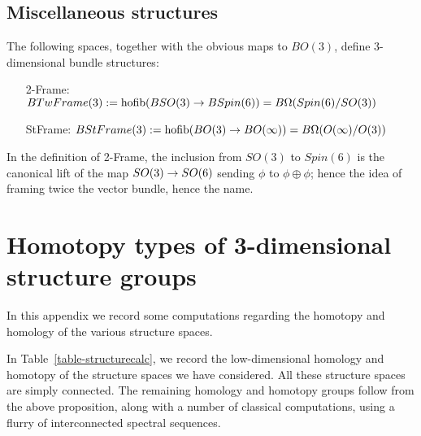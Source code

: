 \documentclass{amsart}
\begin{document}
\subsection{Miscellaneous structures}

\begin{definition}
The following spaces, together with the obvious maps to $BO(3)$, define 3-dimensional bundle structures:
\begin{itemize}
\item[2-Frame:] $BTwFrame(3) := \operatorname{hofib}(BSO(3) \rightarrow BSpin(6)) = B\Omega(Spin(6)/SO(3))$
\item[StFrame:] $BStFrame(3) := \operatorname{hofib}(BO(3) \rightarrow BO(\infty)) = B\Omega(O(\infty)/O(3))$
\end{itemize}
\end{definition}

\nid In the definition of 2-Frame, the inclusion from $SO(3)$ to $Spin(6)$ is the canonical lift of the map $SO(3) \rightarrow SO(6)$ sending $\phi$ to $\phi \oplus \phi$; hence the idea of framing twice the vector bundle, hence the name.  


\section{Homotopy types of 3-dimensional structure groups}


In this appendix we record some computations regarding the homotopy and homology of the various structure spaces.

In Table~\ref{table-structurecalc}, we record the low-dimensional homology and homotopy of the structure spaces we have considered.  All these structure spaces are simply connected.  The remaining homology and homotopy groups follow from the above proposition, along with a number of classical computations, using a flurry of interconnected spectral sequences.  
\end{document}
